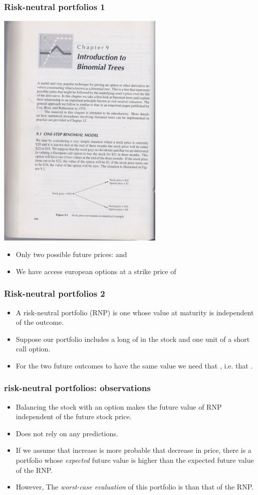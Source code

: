 \documentclass[handout]{beamer}
\newcommand{\R}[1]{{\color{red}{#1}}}
\begin{document}
\begin{frame}
\frametitle{Risk-neutral portfolios 1}
\includegraphics[width=8cm]{BinomialTrees1.pdf}
\begin{itemize}
\item Only two possible future prices: \R{\$18} and \R{\$22}
\item We have access european options at a strike price of \R{\$21}
\end{itemize}
\end{frame}

\begin{frame}
\frametitle{Risk-neutral portfolios 2}
\begin{itemize}
\item A risk-neutral portfolio (RNP) is one whose value at maturity is
  independent of the outcome.
\item Suppose our portfolio includes a long of \R{$\Delta$} in the
  stock and one unit of a short call option.
\item For the two future outcomes to have the same value we need that
\R{$22\Delta -1 = 18\Delta$}, i.e. that \R{$\Delta=1/4$}.
\end{itemize}
\end{frame}

\begin{frame}
\frametitle{risk-neutral portfolios: observations}
\begin{itemize}
\item Balancing the stock with an option makes the future value of RNP
  independent of the future stock price.
\item Does not rely on any predictions.
\item If we assume that increase is more probable that decrease in
  price, there is a portfolio whose {\em expected} future value is
  higher than the expected future value of the RNP.
\item However, The {\em worst-case evaluation} of this portfolio is
  \R{worse} than that of the RNP.
\end{itemize}
\end{frame}
\end{document}
